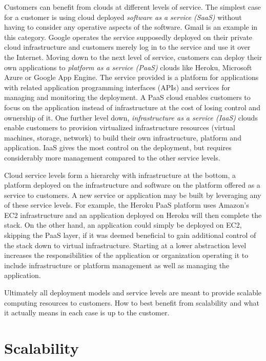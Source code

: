 \documentclass[english]{tktltiki2}
\theoremstyle{definition}
\theoremstyle{remark}
\begin{document}
Customers can benefit from clouds at different levels of service. The simplest
case for a customer is using cloud deployed \emph{software as a service (SaaS)}
without having to consider any operative aspects of the software. Gmail is
an example in this category. Google operates the service supposedly deployed on
their private cloud infrastructure and customers merely log in to the service
and use it over the Internet. Moving down to the next level of service,
customers can deploy their own applications to \emph{platform as a service
(PaaS)} clouds like Heroku, Microsoft Azure or Google App Engine. The service
provided is a platform for applications with related application programming
interfaces (APIs) and services for managing and monitoring the deployment. A
PaaS cloud enables customers to focus on the application instead of
infrastructure at the cost of losing control and ownership of it. One further
level down, \emph{infrastructure as a service (IaaS)} clouds enable customers to
provision virtualized infrastructure resources (virtual machines, storage,
network) to build their own infrastructure, platform and application. IaaS gives
the most control on the deployment, but requires considerably more management
compared to the other service levels.

Cloud service levels form a hierarchy with infrastructure at the bottom, a
platform deployed on the infrastructure and software on the platform offered as
a service to customers. A new service or application may be built by leveraging
any of these service levels. For example, the Heroku PaaS platform uses Amazon’s
EC2 infrastructure and an application deployed on Heroku will then complete the
stack. On the other hand, an application could simply be deployed on EC2,
skipping the PaaS layer, if it was deemed beneficial to gain additional control
of the stack down to virtual infrastructure. Starting at a lower abstraction
level increases the responsibilities of the application or organization
operating it to include infrastructure or platform management as well as
managing the application.

Ultimately all deployment models and service levels are meant to provide
scalable computing resources to customers. How to best benefit from scalability and what it actually means in each case is up to the customer.

\section{Scalability}
\label{sec:scalability}
\end{document}
